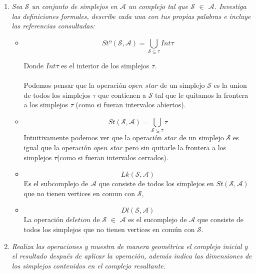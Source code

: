 \documentclass{article}
\begin{document}
\begin{enumerate}
  \item{
      \textsl{
    Sea $\mathcal{S}$ un conjunto de simplejos en $\mathcal{A}$ un
    complejo tal que $\mathcal{S}$ $\in$ $\mathcal{A}$. Investiga las
    definiciones formales, describe cada una con tus propias palabras
    e incluye las referencias consultadas:
    }
    \begin{itemize}
      
    \item{
          \[
           Stº(\mathcal{S}, \mathcal{A}) =  \bigcup_{\mathcal{S}
             \subseteq \tau} Int \tau 
          \]

          Donde $Int\tau$ es el interior de los simplejos $\tau$.\\\\
          Podemos pensar que la operación $open$ $star$ de un simplejo
          $\mathcal{S}$ es la union de
          todos los simplejos $\tau$ que contienen a $\mathcal{S}$
          tal que le quitamos la frontera a los simplejos $\tau$
          (como si fueran intervalos abiertos).
      }
      
    \item{
        \[
           St(\mathcal{S}, \mathcal{A}) =  \bigcup_{\mathcal{S}
             \subseteq \tau} \tau 
           \]
           Intuitivamente podemos ver que la operación $star$ de un
           simplejo $\mathcal{S}$ es igual que la operación $open$
           $star$ pero sin quitarle la frontera a los simplejos
           $\tau$(como si fueran intervalos cerrados).
         }

    \item{
        \[
        Lk(\mathcal{S}, \mathcal{A})
        \]
        Es el subcomplejo de $\mathcal{A}$ que consiste de todos los
        simplejos en $St(\mathcal{S},\mathcal{A})$ que no tienen
        vertices en comun con $\mathcal{S}$,
      }

    \item{
        \[
        Dl(\mathcal{S},\mathcal{A})
        \]
        La operación $deletion$ de $\mathcal{S}$ $\in$ $\mathcal{A}$
        es el sucomplejo de $\mathcal{A}$ que consiste de todos los
        simplejos que no tienen vertices en común con $\mathcal{S}$.
        }
    \end{itemize}

  
  }

\item{
    \textsl{
      Realiza las operaciones y muestra de manera geométrica el
      complejo inicial y el resultado después de aplicar la operación,
      además indica las dimensiones de los simplejos contenidos en el
      complejo resultante.
    }

}
\end{enumerate}
\end{document}
